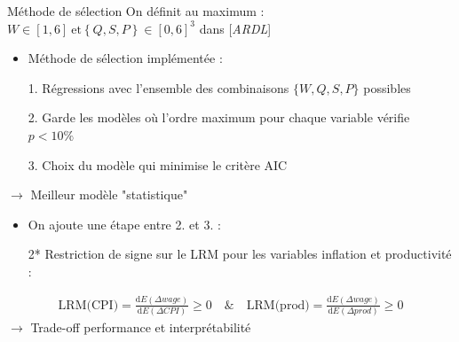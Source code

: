 \documentclass[9pt, xcolor={dvipsnames}]{beamer}
\begin{document}
\begin{frame}[label=est]{Méthode de sélection}
  On définit au maximum : $W\in[1,6]\ \textrm{et} \left\{Q,S,P\right\}\in[0,6]^{3}$ dans [\textit{ARDL}]
  \begin{itemize}
    \item Méthode de sélection implémentée :
    \item[1.] Régressions avec l'ensemble des combinaisons $\{W,Q,S,P\}$ possibles
    \item[2.] Garde les modèles où l'ordre maximum pour chaque variable vérifie $p<10\%$ 
    \item[3.] Choix du modèle qui minimise le critère AIC
  \end{itemize}
  $\rightarrow$ Meilleur modèle "statistique"
  \vspace{.25cm}
  \begin{itemize}
    \item On ajoute une étape entre 2. et 3. :
    \item[2*] Restriction de signe sur le LRM pour les variables inflation et productivité :
  \end{itemize}
  \vspace{.25cm}
  \begin{align*}
    \textrm{LRM(CPI)} = \frac{\mathrm{d}E(\Delta wage)}{\mathrm{d}E(\Delta CPI)} \geq 0 \quad\textrm{\&}\quad \textrm{LRM(prod)} = \frac{\mathrm{d}E(\Delta wage)}{\mathrm{d}E(\Delta prod)} \geq 0
  \end{align*}
  $\rightarrow$ Trade-off performance et interprétabilité
\end{frame}
\end{document}
